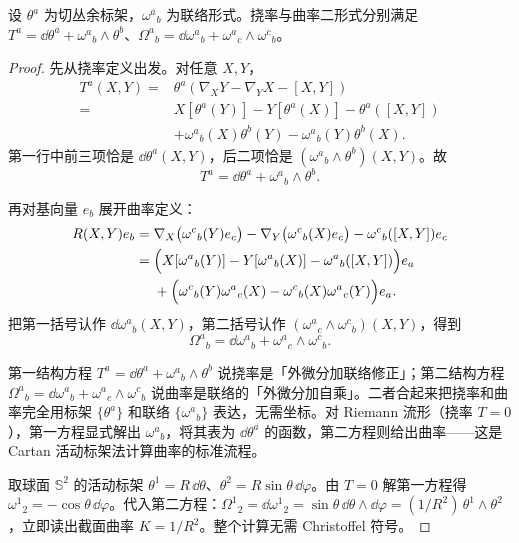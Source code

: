 \begin{theorem}
设 $\theta^a$ 为切丛余标架，$\omega^a{}_b$ 为联络形式。挠率与曲率二形式分别满足 $T^a=\dd\theta^a+\omega^a{}_b\wedge\theta^b$、$\Omega^a{}_b=\dd\omega^a{}_b+\omega^a{}_c\wedge\omega^c{}_b$。
\end{theorem}
\begin{proof}
先从挠率定义出发。对任意 $X,Y$，
\[
\begin{aligned}
T^a(X,Y)
={}&\theta^a(\nabla_XY-\nabla_YX-[X,Y])\\
={}&X[\theta^a(Y)]-Y[\theta^a(X)]-\theta^a([X,Y])\\
&+\omega^a{}_b(X)\theta^b(Y)
-\omega^a{}_b(Y)\theta^b(X).
\end{aligned}
\]
第一行中前三项恰是 $\dd\theta^a(X,Y)$，后二项恰是
$(\omega^a{}_b\wedge\theta^b)(X,Y)$。故
\begin{equation}\label{eq:math-dg-synthesis-cartan-first}
\boxed{T^a=\dd\theta^a+\omega^a{}_b\wedge\theta^b.}
\end{equation}

再对基向量 $e_b$ 展开曲率定义：
\[
\begin{aligned}
R(X,Y)e_b
={}&\nabla_X\bigl(\omega^c{}_b(Y)e_c\bigr)
-\nabla_Y\bigl(\omega^c{}_b(X)e_c\bigr)
-\omega^c{}_b([X,Y])e_c\\
={}&\Bigl(
X[\omega^a{}_b(Y)]-Y[\omega^a{}_b(X)]-\omega^a{}_b([X,Y])
\Bigr)e_a\\
&+\Bigl(
\omega^c{}_b(Y)\omega^a{}_c(X)
-\omega^c{}_b(X)\omega^a{}_c(Y)
\Bigr)e_a.
\end{aligned}
\]
把第一括号认作 $\dd\omega^a{}_b(X,Y)$，第二括号认作
$(\omega^a{}_c\wedge\omega^c{}_b)(X,Y)$，得到
\begin{equation}\label{eq:math-dg-synthesis-cartan-second}
\boxed{
\Omega^a{}_b
=\dd\omega^a{}_b+\omega^a{}_c\wedge\omega^c{}_b.}
\end{equation}

第一结构方程 $T^a=\dd\theta^a+\omega^a{}_b\wedge\theta^b$ 说挠率是「外微分加联络修正」；第二结构方程 $\Omega^a{}_b=\dd\omega^a{}_b+\omega^a{}_c\wedge\omega^c{}_b$ 说曲率是联络的「外微分加自乘」。二者合起来把挠率和曲率完全用标架 $\{\theta^a\}$ 和联络 $\{\omega^a{}_b\}$ 表达，无需坐标。对 Riemann 流形（挠率 $T=0$），第一方程显式解出 $\omega^a{}_b$，将其表为 $\dd\theta^a$ 的函数，第二方程则给出曲率——这是 Cartan 活动标架法计算曲率的标准流程。

取球面 $\mathbb S^2$ 的活动标架 $\theta^1=R\,\dd\theta$、$\theta^2=R\sin\theta\,\dd\varphi$。由 $T=0$ 解第一方程得 $\omega^1{}_2=-\cos\theta\,\dd\varphi$。代入第二方程：$\Omega^1{}_2=\dd\omega^1{}_2=\sin\theta\,\dd\theta\wedge\dd\varphi=(1/R^2)\,\theta^1\wedge\theta^2$，立即读出截面曲率 $K=1/R^2$。整个计算无需 Christoffel 符号。
\end{proof}

